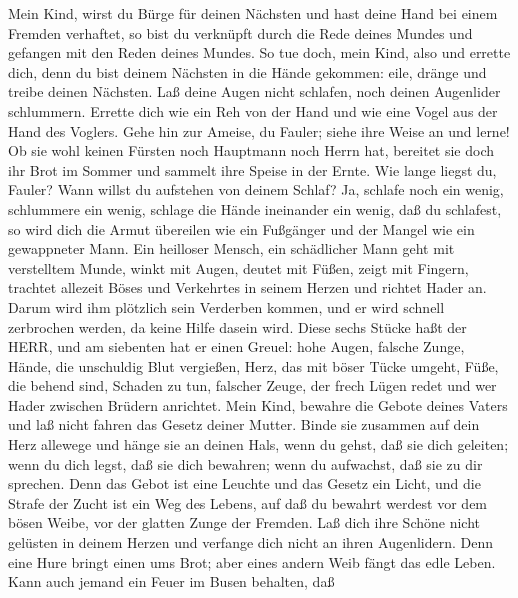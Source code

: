  Mein Kind, wirst du Bürge für deinen Nächsten und hast
deine Hand bei einem Fremden verhaftet,  so bist du
verknüpft durch die Rede deines Mundes und gefangen mit den Reden deines
Mundes.  So tue doch, mein Kind, also und errette dich, denn
du bist deinem Nächsten in die Hände gekommen: eile, dränge und treibe
deinen Nächsten.  Laß deine Augen nicht schlafen, noch
deinen Augenlider schlummern.  Errette dich wie ein Reh von
der Hand und wie eine Vogel aus der Hand des Voglers.  Gehe
hin zur Ameise, du Fauler; siehe ihre Weise an und lerne! 
Ob sie wohl keinen Fürsten noch Hauptmann noch Herrn hat, 
bereitet sie doch ihr Brot im Sommer und sammelt ihre Speise in der
Ernte.  Wie lange liegst du, Fauler? Wann willst du
aufstehen von deinem Schlaf?  Ja, schlafe noch ein wenig,
schlummere ein wenig, schlage die Hände ineinander ein wenig, daß du
schlafest,  so wird dich die Armut übereilen wie ein
Fußgänger und der Mangel wie ein gewappneter Mann.  Ein
heilloser Mensch, ein schädlicher Mann geht mit verstelltem Munde,
 winkt mit Augen, deutet mit Füßen, zeigt mit Fingern,
 trachtet allezeit Böses und Verkehrtes in seinem Herzen
und richtet Hader an.  Darum wird ihm plötzlich sein
Verderben kommen, und er wird schnell zerbrochen werden, da keine Hilfe
dasein wird.  Diese sechs Stücke haßt der HERR, und am
siebenten hat er einen Greuel:  hohe Augen, falsche Zunge,
Hände, die unschuldig Blut vergießen,  Herz, das mit böser
Tücke umgeht, Füße, die behend sind, Schaden zu tun, 
falscher Zeuge, der frech Lügen redet und wer Hader zwischen Brüdern
anrichtet.  Mein Kind, bewahre die Gebote deines Vaters und
laß nicht fahren das Gesetz deiner Mutter.  Binde sie
zusammen auf dein Herz allewege und hänge sie an deinen Hals,
 wenn du gehst, daß sie dich geleiten; wenn du dich legst,
daß sie dich bewahren; wenn du aufwachst, daß sie zu dir sprechen.
 Denn das Gebot ist eine Leuchte und das Gesetz ein Licht,
und die Strafe der Zucht ist ein Weg des Lebens,  auf daß
du bewahrt werdest vor dem bösen Weibe, vor der glatten Zunge der
Fremden.  Laß dich ihre Schöne nicht gelüsten in deinem
Herzen und verfange dich nicht an ihren Augenlidern.  Denn
eine Hure bringt einen ums Brot; aber eines andern Weib fängt das edle
Leben.  Kann auch jemand ein Feuer im Busen behalten, daß
